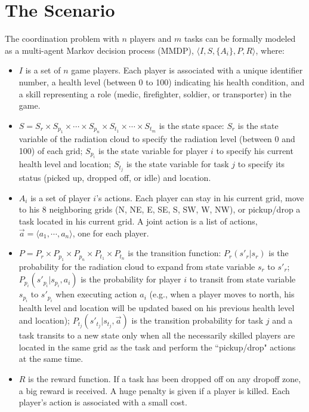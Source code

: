 \documentclass{aamas2014}
\begin{document}
\section{The Scenario}
The coordination problem with $n$ players and $m$ tasks can be
formally modeled as a multi-agent Markov decision process (MMDP),
$\langle I, S, \{A_i\}, P, R \rangle$, where:
\begin{itemize}
  \item $I$ is a set of $n$ game players. Each player is
      associated with a unique identifier number, a health
      level (between 0 to 100) indicating his health condition,
      and a skill representing a role (medic, firefighter,
      soldier, or transporter) in the game.
  \item $S = S_r \times S_{p_1} \times \cdots \times S_{p_n}
      \times S_{t_1} \times \cdots \times S_{t_m}$ is the state
      space: $S_r$ is the state variable of the radiation cloud
      to specify the radiation level (between 0 and 100) of
      each grid; $S_{p_i}$ is the state variable for player $i$
      to specify his current health level and location;
      $S_{t_j}$ is the state variable for task $j$ to specify
      its status (picked up, dropped off, or idle) and
      location.
  \item $A_i$ is a set of player $i$'s actions. Each player can
      stay in his current grid, move to his 8 neighboring grids
      (N, NE, E, SE, S, SW, W, NW), or pickup/drop a task
      located in his current grid. A joint action is a list of
      actions, $\vec{a}=\langle a_1, \cdots, a_n \rangle$, one
      for each player.
  \item $P = P_r \times P_{p_1} \times P_{p_n} \times P_{t_1}
      \times P_{t_n}$ is the transition function:
      $P_r(s'_r|s_r)$ is the probability for the radiation
      cloud to expand from state variable $s_r$ to $s'_r$;
      $P_{p_i}(s'_{p_i}|s_{p_i}, a_i)$ is the probability for
      player $i$ to transit from state variable $s_{p_i}$ to
      $s'_{p_i}$ when executing action $a_i$ (e.g., when a
      player moves to north, his health level and location will
      be updated based on his previous health level and
      location); $P_{t_j}(s'_{t_j}|s_{t_j}, \vec{a})$ is the
      transition probability for task $j$ and a task transits
      to a new state only when all the necessarily skilled
      players are located in the same grid as the task and
      perform the ``pickup/drop" actions at the same time.
  \item $R$ is the reward function. If a task has been dropped
      off on any dropoff zone, a big reward is received. A huge
      penalty is given if a player is killed. Each player's
      action is associated with a small cost.
\end{itemize}
\end{document}
